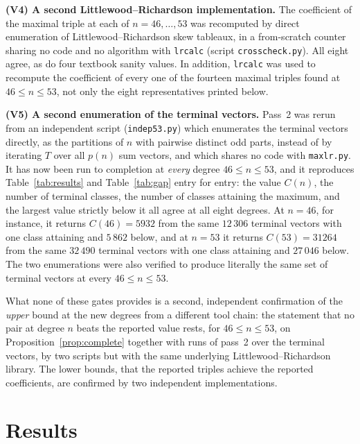 \documentclass[11pt]{article}
\theoremstyle{remark}
\begin{document}
\medskip
\noindent\textbf{(V4) A second Littlewood--Richardson implementation.} The coefficient of
the maximal triple at each of $n=46,\dots,53$ was recomputed by direct enumeration of
Littlewood--Richardson skew tableaux, in a from-scratch counter sharing no code and no
algorithm with \texttt{lrcalc} (script \texttt{crosscheck.py}). All eight agree, as do
four textbook sanity values. In addition, \texttt{lrcalc} was used to recompute the
coefficient of every one of the fourteen maximal triples found at $46\le n\le 53$, not
only the eight representatives printed below.

\medskip
\noindent\textbf{(V5) A second enumeration of the terminal vectors.} Pass~2 was rerun
from an independent script (\texttt{indep53.py}) which enumerates the terminal vectors
directly, as the partitions of $n$ with pairwise distinct odd parts, instead of by
iterating $T$ over all $p(n)$ sum vectors, and which shares no code with
\texttt{maxlr.py}. It has now been run to completion at \emph{every} degree
$46\le n\le 53$, and it reproduces Table~\ref{tab:results} and Table~\ref{tab:gap}
entry for entry: the value $C(n)$, the number of terminal classes, the number of
classes attaining the maximum, and the largest value strictly below it all agree at
all eight degrees. At $n=46$, for instance, it returns $C(46)=5932$ from the same
$12\,306$ terminal vectors with one class attaining and $5\,862$ below, and at $n=53$
it returns $C(53)=31264$ from the same $32\,490$ terminal vectors with one class
attaining and $27\,046$ below. The two enumerations were also verified to produce
literally the same set of terminal vectors at every $46\le n\le 53$.

\medskip
What none of these gates provides is a second, independent confirmation of the
\emph{upper} bound at the new degrees from a different tool chain: the statement that no
pair at degree $n$ beats the reported value rests, for $46\le n\le 53$, on
Proposition~\ref{prop:complete} together with runs of pass~2 over the terminal vectors,
by two scripts but with the same underlying Littlewood--Richardson library. The lower
bounds, that the reported triples achieve the reported coefficients, are confirmed by two
independent implementations.

\section{Results}\label{sec:results}
\end{document}
